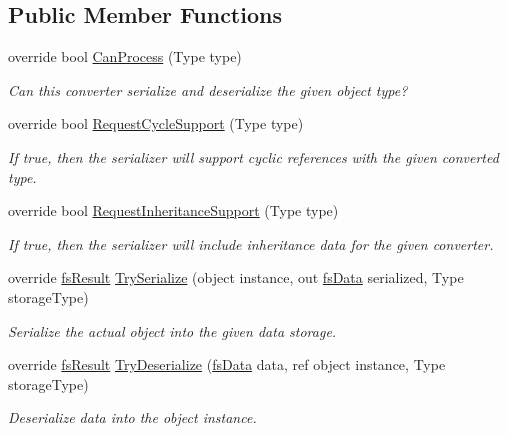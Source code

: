\subsection*{Public Member Functions}
\begin{DoxyCompactItemize}
\item 
override bool \hyperlink{class_full_serializer_1_1_internal_1_1fs_type_converter_afbf95621a91efff18569544dee5134fe}{Can\+Process} (Type type)
\begin{DoxyCompactList}\small\item\em Can this converter serialize and deserialize the given object type? \end{DoxyCompactList}\item 
override bool \hyperlink{class_full_serializer_1_1_internal_1_1fs_type_converter_a60f6421c5356bcf6954d3c888bbaf860}{Request\+Cycle\+Support} (Type type)
\begin{DoxyCompactList}\small\item\em If true, then the serializer will support cyclic references with the given converted type. \end{DoxyCompactList}\item 
override bool \hyperlink{class_full_serializer_1_1_internal_1_1fs_type_converter_a3f4750a4e8a6a6ae582c73cf5d8142e5}{Request\+Inheritance\+Support} (Type type)
\begin{DoxyCompactList}\small\item\em If true, then the serializer will include inheritance data for the given converter. \end{DoxyCompactList}\item 
override \hyperlink{struct_full_serializer_1_1fs_result}{fs\+Result} \hyperlink{class_full_serializer_1_1_internal_1_1fs_type_converter_aced300086882c6f0ce70ff8ff7ae46c2}{Try\+Serialize} (object instance, out \hyperlink{class_full_serializer_1_1fs_data}{fs\+Data} serialized, Type storage\+Type)
\begin{DoxyCompactList}\small\item\em Serialize the actual object into the given data storage. \end{DoxyCompactList}\item 
override \hyperlink{struct_full_serializer_1_1fs_result}{fs\+Result} \hyperlink{class_full_serializer_1_1_internal_1_1fs_type_converter_aa94af57c0f67c755cb406529813a13aa}{Try\+Deserialize} (\hyperlink{class_full_serializer_1_1fs_data}{fs\+Data} data, ref object instance, Type storage\+Type)
\begin{DoxyCompactList}\small\item\em Deserialize data into the object instance. \end{DoxyCompactList}\item 

\end{DoxyCompactItemize}
